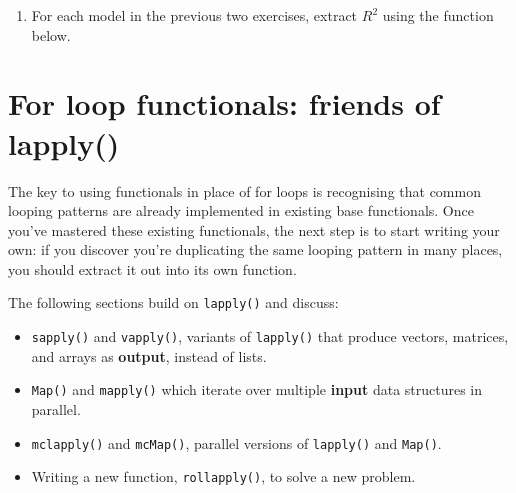 \begin{enumerate}
\begin{Shaded}
\begin{Highlighting}[]
\StringTok{ }\NormalTok{(}\OperatorTok{:}\NormalTok{, }
\StringTok{ }\NormalTok{(}\OperatorTok{:} \NormalTok{)}
\NormalTok{\})}
\end{Highlighting}
\end{Shaded}
\item
  For each model in the previous two exercises, extract \(R^2\) using
  the function below.

\begin{Shaded}
\begin{Highlighting}[]
\StringTok{ }\OperatorTok{$}
\end{Highlighting}
\end{Shaded}
\end{enumerate}

\hypertarget{functionals-loop}{%
\section{For loop functionals: friends of
lapply()}\label{functionals-loop}}

The key to using functionals in place of for loops is recognising that
common looping patterns are already implemented in existing base
functionals. Once you've mastered these existing functionals, the next
step is to start writing your own: if you discover you're duplicating
the same looping pattern in many places, you should extract it out into
its own function.

The following sections build on \texttt{lapply()} and discuss:

\begin{itemize}
\item
  \texttt{sapply()} and \texttt{vapply()}, variants of \texttt{lapply()}
  that produce vectors, matrices, and arrays as \textbf{output}, instead
  of lists.
\item
  \texttt{Map()} and \texttt{mapply()} which iterate over multiple
  \textbf{input} data structures in parallel.
\item
  \texttt{mclapply()} and \texttt{mcMap()}, parallel versions of
  \texttt{lapply()} and \texttt{Map()}.
\item
  Writing a new function, \texttt{rollapply()}, to solve a new problem.
\end{itemize}

